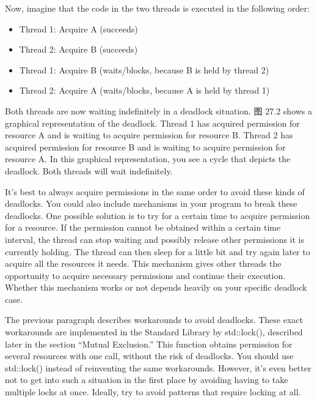 Now, imagine that the code in the two threads is executed in the following order:

\begin{itemize}
\item
Thread 1: Acquire A (succeeds)

\item
Thread 2: Acquire B (succeeds)

\item
Thread 1: Acquire B (waits/blocks, because B is held by thread 2)

\item
Thread 2: Acquire A (waits/blocks, because A is held by thread 1)
\end{itemize}

Both threads are now waiting indefinitely in a deadlock situation. 图 27.2 shows a graphical representation of the deadlock. Thread 1 has acquired permission for resource A and is waiting to acquire permission for resource B. Thread 2 has acquired permission for resource B and is waiting to acquire permission for resource A. In this graphical representation, you see a cycle that depicts the deadlock. Both threads will wait indefinitely.


It’s best to always acquire permissions in the same order to avoid these kinds of deadlocks. You could also include mechanisms in your program to break these deadlocks. One possible solution is to try for a certain time to acquire permission for a resource. If the permission cannot be obtained within a certain time interval, the thread can stop waiting and possibly release other permissions it is currently holding. The thread can then sleep for a little bit and try again later to acquire all the resources it needs. This mechanism gives other threads the opportunity to acquire necessary permissions and continue their execution. Whether this mechanism works or not depends heavily on your specific deadlock case.

The previous paragraph describes workarounds to avoid deadlocks. These exact workarounds are implemented in the Standard Library by std::lock(), described later in the section “Mutual Exclusion.” This function obtains permission for several resources with one call, without the risk of deadlocks. You should use std::lock() instead of reinventing the same workarounds. However, it’s even better not to get into such a situation in the first place by avoiding having to take multiple locks at once. Ideally, try to avoid patterns that require locking at all.

